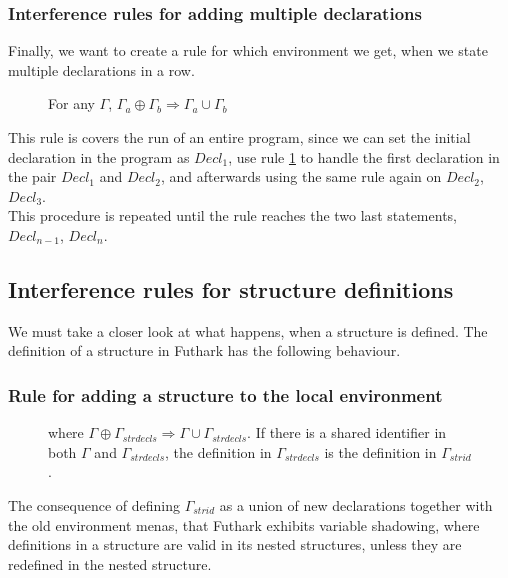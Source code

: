 \subsubsection{Interference rules for adding multiple declarations}
Finally, we want to create a rule for which environment we get, when we state
multiple declarations in a row.
\begin{figure}\label{Rule2multiple}
  \begin{tcolorbox}
    \begin{prooftree}
      \end{prooftree}
      For any $\Gamma$, $\Gamma_a \oplus \Gamma_b \Rightarrow \Gamma_a \cup \Gamma_b$
    \end{tcolorbox}
\end{figure}
This rule is covers the run of an entire program, since we can set the initial
declaration in the program as $Decl_1$, use rule \ref{Rule2multiple} to handle
the first declaration in the pair $Decl_1$ and $Decl_2$, and afterwards using
the same rule again on $Decl_2$, $Decl_3$.
\\
This procedure is repeated until the rule reaches the two last statements,
$Decl_{n-1}$, $Decl_n$. 
\subsection{Interference rules for structure definitions}
We must take a closer look at what happens, when a structure is defined.
The definition of a structure in Futhark has the following behaviour.
\subsubsection{Rule for adding a structure to the local environment}
\begin{figure}[h!]\label{Rule3}
  \begin{tcolorbox}
    \begin{prooftree}
    \end{prooftree}
    where $\Gamma \oplus \Gamma_{strdecls} \Rightarrow \Gamma \cup
    \Gamma_{strdecls}.$
    If there is a shared identifier in both $\Gamma$ and $\Gamma_{strdecls}$,
    the definition in $\Gamma_{strdecls}$ is the definition in $\Gamma_{strid}$.
  \end{tcolorbox}
\end{figure}
The consequence of defining $\Gamma_{strid}$ as a union of new declarations together with the old environment menas, that Futhark exhibits variable shadowing, where definitions in a structure are valid in its nested structures, unless they are redefined in the nested structure.


